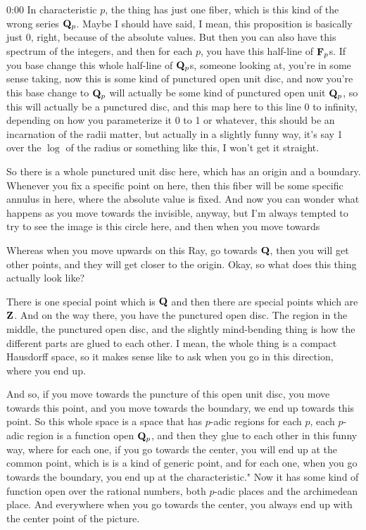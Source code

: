 \begin{unfinished}{0:00}
In characteristic $p$, the thing has just one fiber, which is this kind of the wrong series $\mathbf Q_p$. Maybe I should have said, I mean, this proposition is basically just 0, right, because of the absolute values. But then you can also have this spectrum of the integers, and then for each $p$, you have this half-line of $\mathbf F_p$s. If you base change this whole half-line of $\mathbf Q_p$s, someone looking at, you're in some sense taking, now this is some kind of punctured open unit disc, and now you're this base change to $\mathbf Q_p$ will actually be some kind of punctured open unit $\mathbf Q_p$, so this will actually be a punctured disc, and this map here to this line 0 to infinity, depending on how you parameterize it 0 to 1 or whatever, this should be an incarnation of the radii matter, but actually in a slightly funny way, it's say 1 over the $\log$ of the radius or something like this, I won't get it straight.

So there is a whole punctured unit disc here, which has an origin and a boundary. Whenever you fix a specific point on here, then this fiber will be some specific annulus in here, where the absolute value is fixed. And now you can wonder what happens as you move towards the invisible, anyway, but I'm always tempted to try to see the image is this circle here, and then when you move towards

Whereas when you move upwards on this Ray, go towards $\mathbf Q$, then you will get other points, and they will get closer to the origin. Okay, so what does this thing actually look like?

There is one special point which is $\mathbf Q$ and then there are special points which are $\mathbf Z$. And on the way there, you have the punctured open disc. The region in the middle, the punctured open disc, and the slightly mind-bending thing is how the different parts are glued to each other. I mean, the whole thing is a compact Hausdorff space, so it makes sense like to ask when you go in this direction, where you end up.

And so, if you move towards the puncture of this open unit disc, you move towards this point, and you move towards the boundary, we end up towards this point. So this whole space is a space that has $p$-adic regions for each $p$, each $p$-adic region is a function open $\mathbf Q_p$, and then they glue to each other in this funny way, where for each one, if you go towards the center, you will end up at the common point, which is is a kind of generic point, and for each one, when you go towards the boundary, you end up at the characteristic."
Now it has some kind of function open over the rational numbers, both $p$-adic places and the archimedean place. And everywhere when you go towards the center, you always end up with the center point of the picture.


\end{unfinished}
